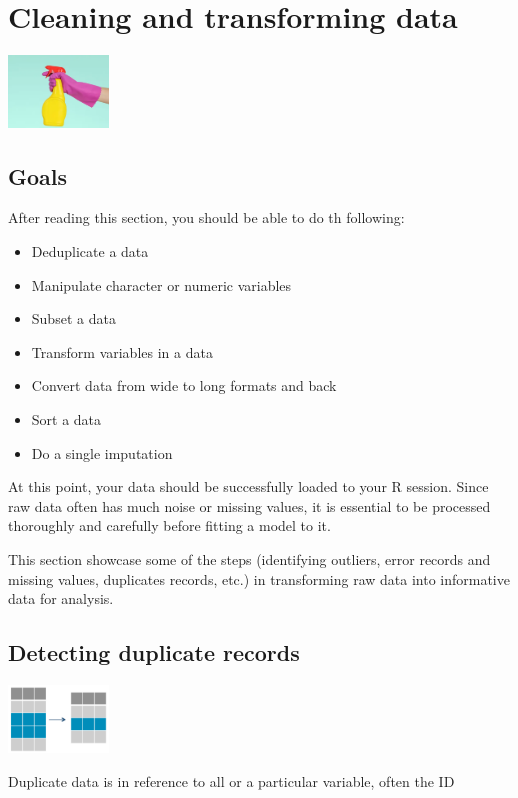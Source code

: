\documentclass[a4paper]{article}\usepackage[]{graphicx}\usepackage[]{xcolor}
\begin{document}
\section{Cleaning and transforming data}

\begin{center}
 \includegraphics[width = 0.2\textwidth]{./image/cleaning_data.png}    
\end{center} 

\subsection*{Goals}
After reading this section, you should be able to do th following:
\begin{itemize}
\item Deduplicate a data
\item Manipulate character or numeric variables 
\item Subset a data
\item Transform variables in a data
\item Convert data from wide to long formats and back
\item Sort a data
\item Do a single imputation
\end{itemize} 

\noindent At this point, your data should be successfully loaded to your R session. Since raw data often has much noise or missing values, it is essential to be processed thoroughly and carefully before fitting a model to it. \vspace{1em}

\noindent This section showcase some of the steps (identifying outliers, error records and missing values, duplicates records, etc.) in transforming raw data into informative data for analysis. \vspace{1em}

\subsection{Detecting duplicate records}

\begin{center}
\includegraphics[width = 0.2\textwidth]{./image/deduplication.png}    
\end{center} 
\noindent Duplicate data is in reference to all or a particular variable, often the ID \vspace{1em}
\end{document}
